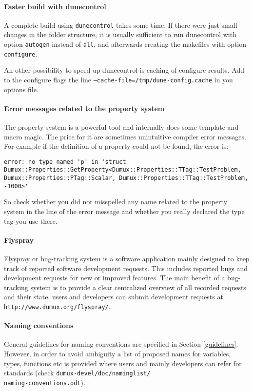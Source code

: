 \paragraph{Faster build with dunecontrol}
A complete build using \texttt{dunecontrol} takes some time. If there were just small changes in the folder structure, it is usually sufficient to run dunecontrol with option \texttt{autogen} instead of \texttt{all}, and afterwards creating the makefiles with option \texttt{configure}.

An other possibility to speed up dunecontrol is caching of configure results. Add to the configure flags the line \texttt{--cache-file=/tmp/dune-config.cache} in you options file.

\paragraph{Error messages related to the property system}
The property system is a powerful tool and internally does some template and macro magic. 
The price for it are sometimes unintuitive compiler error messages. For example if the
definition of a property could not be found, the error is:
\begin{lstlisting}[style=DumuxCode,numbers=none]
error: no type named 'p' in 'struct Dumux::Properties::GetProperty<Dumux::Properties::TTag::TestProblem, Dumux::Properties::PTag::Scalar, Dumux::Properties::TTag::TestProblem, -1000>'
\end{lstlisting}

So check whether you did not misspelled any name related to the property system in the 
line of the error message and whether you really declared the type tag you use there.

\paragraph{Flyspray}
Flyspray or bug-tracking system is a software application mainly designed to keep track of reported software development requests. This includes reported bugs and development requests for new or improved features. The main benefit of a bug-tracking system is to provide a clear centralized overview of all recorded requests and their state. \Dumux users and developers can submit development requests at \texttt{http://www.dumux.org/flyspray/}.

\paragraph{Naming conventions} 
General guidelines for naming conventions are specified in Section \ref{guidelines}. However, in order to avoid ambiguity a list of proposed names for variables, types, functions etc is provided where users and mainly \Dumux developers can refer for standards (check \texttt{dumux-devel/doc/naminglist/\\naming-conventions.odt}).
